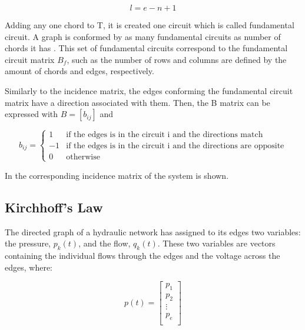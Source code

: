 \begin{equation}
  \label{Numberofchords}
  l = e - n +1
\end{equation}

Adding any one chord to T, it is created one circuit which is called fundamental circuit. A graph is conformed by as many fundamental circuits as number of chords it has \cite{GraphModel}.  
This set of fundamental circuits correspond to the fundamental circuit matrix 
$B_f$, such as the number of rows and columns are defined by the amount of chords and edges, respectively. 

Similarly to the incidence matrix, the edges conforming the fundamental circuit 
matrix have a direction associated with them. Then, the B matrix can be 
expressed with $B = [b_{ij}]$ and

\begin{equation}
\label{DiGraphCycle}
 b_{ij} =
		\left\{
		\begin{array}{ll}
		
		1 			&      \text{if the edges is in the circuit i and the directions match}	
\\
		-1                       &     \text{if the edges is in the circuit i and the directions are opposite}
\\

                0                       &      \text{otherwise}

		\end{array}
		\right.
\end{equation}	

In  the corresponding incidence matrix of the system is 
shown.

\subsection{Kirchhoff's Law}
\label{KirchhoffSection}

The directed graph of a hydraulic network has assigned to its edges two variables: 
the pressure, $p_k(t)$, and the flow, $q_k(t)$. These two variables are vectors containing the individual flows through the edges and 
the voltage across the edges, where:


\begin{minipage}{0.45\linewidth}
\begin{equation}
p(t) =
\begin{bmatrix}
         p_1 \\
	p_2 \\ 
	\vdots \\
	p_e \\
\end{bmatrix}  \nonumber
\end{equation}  
\end{minipage}

